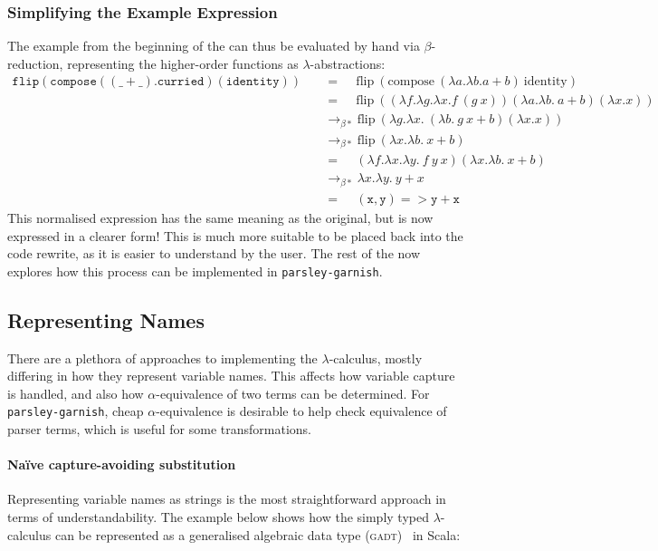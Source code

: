 \documentclass[../../../main.tex]{subfiles}
\begin{document}
\subsubsection{Simplifying the Example Expression}
The example from the beginning of the  can thus be evaluated by hand via $\beta$-reduction, representing the higher-order functions as $\lambda$-abstractions:
\begin{align*}
\mathtt{flip(compose((\_ + \_).curried)(identity))}\quad &\mathrel{=\quad\,} \mathrm{flip}\ (\mathrm{compose}\ (\lambda a. \lambda b. a + b)\ \mathrm{identity}) \\
&\mathrel{=\quad\,} \mathrm{flip}\ ( (\lambda f. \lambda g. \lambda x. f\ (g\ x)) (\lambda a. \lambda b.\ a + b) (\lambda x. x)) \\
&\rightarrow_{\beta*} \mathrm{flip}\ (\lambda g. \lambda x.\ (\lambda b.\ g\ x + b) (\lambda x. x)) \\
&\rightarrow_{\beta*} \mathrm{flip}\ (\lambda x. \lambda b.\ x + b) \\
&\mathrel{=\quad\,} (\lambda f. \lambda x. \lambda y.\ f\ y\ x) (\lambda x. \lambda b.\ x + b) \\
&\rightarrow_{\beta*} \lambda x. \lambda y.\ y + x \\
&\mathrel{=\quad\,} \mathtt{(x, y) => y + x}
\end{align*}
%
This normalised expression has the same meaning as the original, but is now expressed in a clearer form!
This is much more suitable to be placed back into the code rewrite, as it is easier to understand by the user.
The rest of the  now explores how this process can be implemented in \texttt{parsley-garnish}.

\subsection{Representing Names}
There are a plethora of approaches to implementing the $\lambda$-calculus, mostly differing in how they represent variable names.
This affects how variable capture is handled, and also how $\alpha$-equivalence of two terms can be determined.
For \texttt{parsley-garnish}, cheap $\alpha$-equivalence is desirable to help check equivalence of parser terms, which is useful for some transformations.

\paragraph{Naïve capture-avoiding substitution}
Representing variable names as strings is the most straightforward approach in terms of understandability.
The example below shows how the simply typed $\lambda$-calculus can be represented as a generalised algebraic data type (\textsc{gadt})~\cite{cheney_gadt_2003} in Scala:
\end{document}
